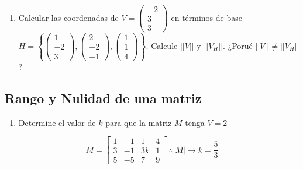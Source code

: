 \documentclass[
  11,
]{article}
\providecommand{\tightlist}{%
  \setlength{\itemsep}{0pt}\setlength{\parskip}{0pt}}
\begin{document}
\begin{enumerate}
\def\labelenumi{\arabic{enumi}.}
\setcounter{enumi}{8}
\tightlist
\item
  Calcular las coordenadas de
  \(V = \begin{pmatrix} -2 \\ 3 \\ 3 \end{pmatrix}\) en términos de base
  \(H = \left\{ \begin{pmatrix} 1 \\ -2 \\3 \end{pmatrix}, \begin{pmatrix}2 \\ -2 \\ -1 \end{pmatrix}, \begin{pmatrix}1\\1\\4\end{pmatrix} \right\}\).
  Calcule \(||V||\) y \(||V_H||\). ¿Porué \(||V|| \ne ||V_H||\)?
\end{enumerate}

\hypertarget{rango-y-nulidad-de-una-matriz}{%
\subsection{Rango y Nulidad de una
matriz}\label{rango-y-nulidad-de-una-matriz}}

\begin{enumerate}
\def\labelenumi{\arabic{enumi}.}
\tightlist
\item
  Determine el valor de \(k\) para que la matriz \(M\) tenga \(V=2\)
\end{enumerate}

\[
  M = \begin{bmatrix}1&-1&1&4\\3&-1&3k&1\\5&-5&7&9\end{bmatrix} \therefore |M| \rightarrow k = \frac{5}{3}
   \]
\end{document}
